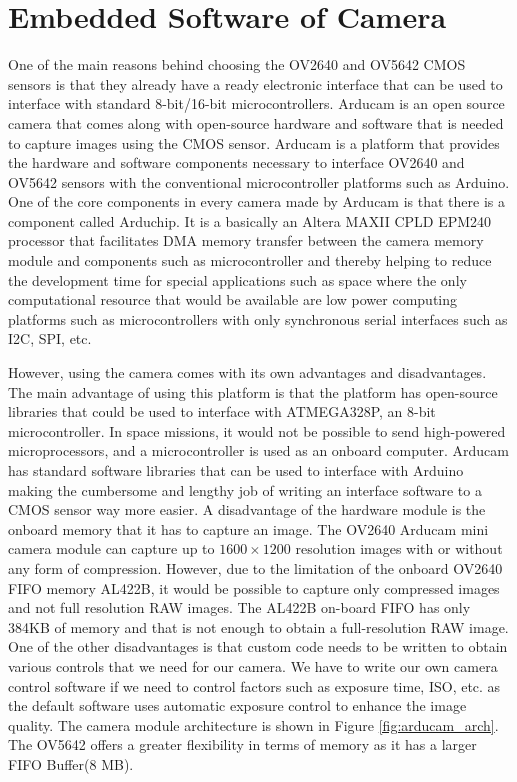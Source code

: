 \section{Embedded Software of Camera}
One of the main reasons behind choosing the OV2640 and OV5642 CMOS sensors is that they already have a ready electronic interface that can be used to interface with standard 8-bit/16-bit microcontrollers. Arducam is an open source camera that comes along with open-source hardware and software that is needed to capture images using the CMOS sensor. Arducam is a platform that provides the hardware and software components necessary to interface OV2640 and OV5642 sensors with the conventional microcontroller platforms such as Arduino. One of the core components in every camera made by Arducam is that there is a component called Arduchip\cite{Arduchip}. It is a basically an Altera MAXII CPLD EPM240 processor that facilitates DMA memory transfer between the camera memory module and components such as microcontroller and thereby helping to reduce the development time for special applications such as space where the only computational resource that would be available are low power computing platforms such as microcontrollers with only synchronous serial interfaces such as I2C, SPI, etc. 

However, using the camera comes with its own advantages and disadvantages. The main advantage of using this platform is that the platform has open-source libraries that could be used to interface with ATMEGA328P, an 8-bit microcontroller. In space missions, it would not be possible to send high-powered microprocessors, and a microcontroller is used as an onboard computer. Arducam has standard software libraries that can be used to interface with Arduino making the cumbersome and lengthy job of writing an interface software to a CMOS sensor way more easier.  A disadvantage of the hardware module is the onboard memory that it has to capture an image. The OV2640 Arducam mini camera module can capture up to $1600 \times 1200$ resolution images with or without any form of compression. However, due to the limitation of the onboard OV2640 FIFO memory AL422B, it would be possible to capture only compressed images and not full resolution RAW images. The AL422B on-board FIFO has only 384KB of memory and that is not enough to obtain a full-resolution RAW image. One of the other disadvantages is that custom code needs to be written to obtain various controls that we need for our camera. We have to write our own camera control software if we need to control factors such as exposure time, ISO, etc. as the default software uses automatic exposure control to enhance the image quality. The camera module architecture is shown in Figure \ref{fig:arducam_arch}. The OV5642 offers a greater flexibility in terms of memory as it has a larger FIFO Buffer(8 MB).

